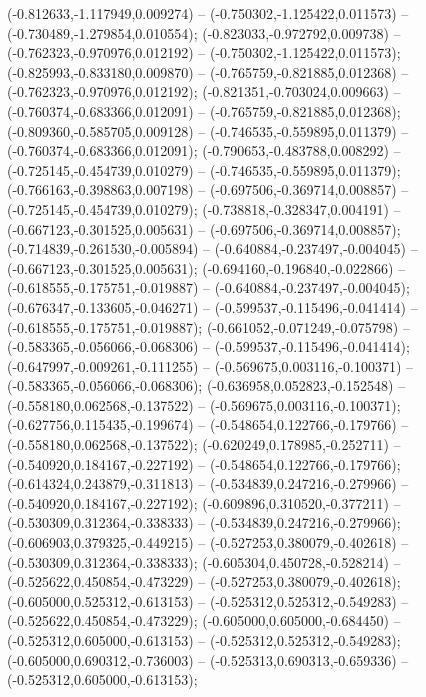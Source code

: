  (-0.812633,-1.117949,0.009274) -- (-0.750302,-1.125422,0.011573) -- (-0.730489,-1.279854,0.010554);
 (-0.823033,-0.972792,0.009738) -- (-0.762323,-0.970976,0.012192) -- (-0.750302,-1.125422,0.011573);
 (-0.825993,-0.833180,0.009870) -- (-0.765759,-0.821885,0.012368) -- (-0.762323,-0.970976,0.012192);
 (-0.821351,-0.703024,0.009663) -- (-0.760374,-0.683366,0.012091) -- (-0.765759,-0.821885,0.012368);
 (-0.809360,-0.585705,0.009128) -- (-0.746535,-0.559895,0.011379) -- (-0.760374,-0.683366,0.012091);
 (-0.790653,-0.483788,0.008292) -- (-0.725145,-0.454739,0.010279) -- (-0.746535,-0.559895,0.011379);
 (-0.766163,-0.398863,0.007198) -- (-0.697506,-0.369714,0.008857) -- (-0.725145,-0.454739,0.010279);
 (-0.738818,-0.328347,0.004191) -- (-0.667123,-0.301525,0.005631) -- (-0.697506,-0.369714,0.008857);
 (-0.714839,-0.261530,-0.005894) -- (-0.640884,-0.237497,-0.004045) -- (-0.667123,-0.301525,0.005631);
 (-0.694160,-0.196840,-0.022866) -- (-0.618555,-0.175751,-0.019887) -- (-0.640884,-0.237497,-0.004045);
 (-0.676347,-0.133605,-0.046271) -- (-0.599537,-0.115496,-0.041414) -- (-0.618555,-0.175751,-0.019887);
 (-0.661052,-0.071249,-0.075798) -- (-0.583365,-0.056066,-0.068306) -- (-0.599537,-0.115496,-0.041414);
 (-0.647997,-0.009261,-0.111255) -- (-0.569675,0.003116,-0.100371) -- (-0.583365,-0.056066,-0.068306);
 (-0.636958,0.052823,-0.152548) -- (-0.558180,0.062568,-0.137522) -- (-0.569675,0.003116,-0.100371);
 (-0.627756,0.115435,-0.199674) -- (-0.548654,0.122766,-0.179766) -- (-0.558180,0.062568,-0.137522);
 (-0.620249,0.178985,-0.252711) -- (-0.540920,0.184167,-0.227192) -- (-0.548654,0.122766,-0.179766);
 (-0.614324,0.243879,-0.311813) -- (-0.534839,0.247216,-0.279966) -- (-0.540920,0.184167,-0.227192);
 (-0.609896,0.310520,-0.377211) -- (-0.530309,0.312364,-0.338333) -- (-0.534839,0.247216,-0.279966);
 (-0.606903,0.379325,-0.449215) -- (-0.527253,0.380079,-0.402618) -- (-0.530309,0.312364,-0.338333);
 (-0.605304,0.450728,-0.528214) -- (-0.525622,0.450854,-0.473229) -- (-0.527253,0.380079,-0.402618);
 (-0.605000,0.525312,-0.613153) -- (-0.525312,0.525312,-0.549283) -- (-0.525622,0.450854,-0.473229);
 (-0.605000,0.605000,-0.684450) -- (-0.525312,0.605000,-0.613153) -- (-0.525312,0.525312,-0.549283);
 (-0.605000,0.690312,-0.736003) -- (-0.525313,0.690313,-0.659336) -- (-0.525312,0.605000,-0.613153);
